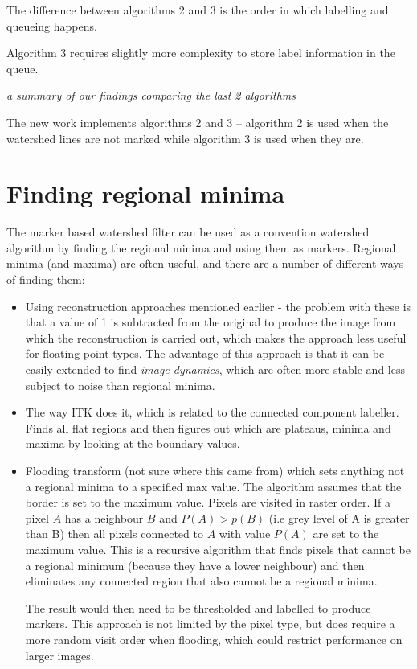 \documentclass{InsightArticle}
\begin{document}
The difference between algorithms 2 and 3 is the order in which
labelling and queueing happens.

Algorithm 3 requires slightly more complexity to store label
information in the queue.

{\em a summary of our findings comparing the last 2 algorithms}

The new work implements algorithms 2 and 3 -- algorithm 2 is used when
the watershed lines are not marked while algorithm 3 is used when they
are.

\section{Finding regional minima}
The marker based watershed filter can be used as a convention
watershed algorithm by finding the regional minima and using them as
markers. Regional minima (and maxima) are often useful, and there are
a number of different ways of finding them:
\begin{itemize}
\item Using reconstruction approaches mentioned earlier - 
the problem with these is that a value of 1 is subtracted from the
original to produce the image from which the reconstruction is carried
out, which makes the approach less useful for floating point
types. The advantage of this approach is that it can be easily
extended to find {\em image dynamics}, which are often more stable and
less subject to noise than regional minima.
\item The way ITK does it, which is related to the connected 
component labeller. Finds all flat regions and then figures out which
are plateaus, minima and maxima by looking at the boundary values.
\item Flooding transform (not sure where this came from) which 
sets anything not a regional minima to a specified max value. The
algorithm assumes that the border is set to the maximum value. Pixels
are visited in raster order. If a pixel $A$ has a neighbour $B$ and
$P(A) > p(B)$ (i.e grey level of A is greater than B) then all pixels
connected to $A$ with value $P(A)$ are set to the maximum value. This
is a recursive algorithm that finds pixels that cannot be a regional
minimum (because they have a lower neighbour) and then eliminates any
connected region that also cannot be a regional minima.

The result would then need to be thresholded and labelled to produce
markers. This approach is not limited by the pixel type, but does
require a more random visit order when flooding, which could restrict
performance on larger images.
\end{itemize}
\end{document}
